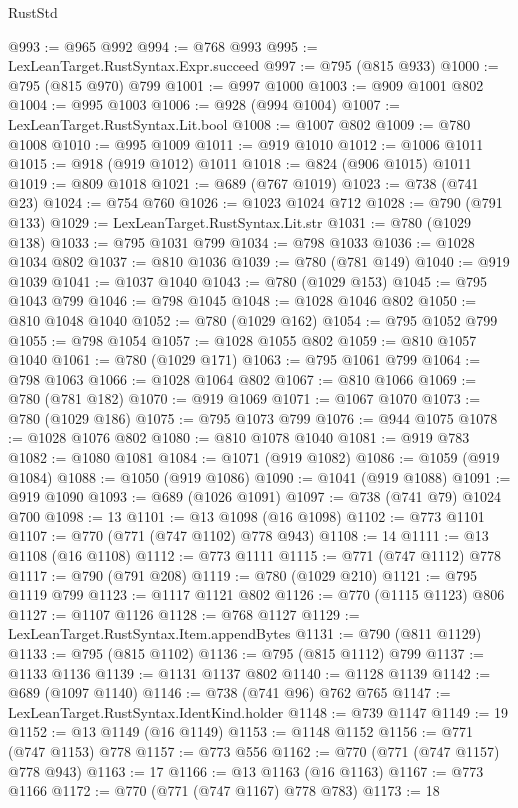 \begin{lexlean}{RustStd}
\begin{coremodule}
@993 := @965 @992
@994 := @768 @993
@995 := LexLeanTarget.RustSyntax.Expr.succeed
@997 := @795 (@815 @933)
@1000 := @795 (@815 @970) @799
@1001 := @997 @1000
@1003 := @909 @1001 @802
@1004 := @995 @1003
@1006 := @928 (@994 @1004)
@1007 := LexLeanTarget.RustSyntax.Lit.bool
@1008 := @1007 @802
@1009 := @780 @1008
@1010 := @995 @1009
@1011 := @919 @1010
@1012 := @1006 @1011
@1015 := @918 (@919 @1012) @1011
@1018 := @824 (@906 @1015) @1011
@1019 := @809 @1018
@1021 := @689 (@767 @1019)
@1023 := @738 (@741 @23)
@1024 := @754 @760
@1026 := @1023 @1024 @712
@1028 := @790 (@791 @133)
@1029 := LexLeanTarget.RustSyntax.Lit.str
@1031 := @780 (@1029 @138)
@1033 := @795 @1031 @799
@1034 := @798 @1033
@1036 := @1028 @1034 @802
@1037 := @810 @1036
@1039 := @780 (@781 @149)
@1040 := @919 @1039
@1041 := @1037 @1040
@1043 := @780 (@1029 @153)
@1045 := @795 @1043 @799
@1046 := @798 @1045
@1048 := @1028 @1046 @802
@1050 := @810 @1048 @1040
@1052 := @780 (@1029 @162)
@1054 := @795 @1052 @799
@1055 := @798 @1054
@1057 := @1028 @1055 @802
@1059 := @810 @1057 @1040
@1061 := @780 (@1029 @171)
@1063 := @795 @1061 @799
@1064 := @798 @1063
@1066 := @1028 @1064 @802
@1067 := @810 @1066
@1069 := @780 (@781 @182)
@1070 := @919 @1069
@1071 := @1067 @1070
@1073 := @780 (@1029 @186)
@1075 := @795 @1073 @799
@1076 := @944 @1075
@1078 := @1028 @1076 @802
@1080 := @810 @1078 @1040
@1081 := @919 @783
@1082 := @1080 @1081
@1084 := @1071 (@919 @1082)
@1086 := @1059 (@919 @1084)
@1088 := @1050 (@919 @1086)
@1090 := @1041 (@919 @1088)
@1091 := @919 @1090
@1093 := @689 (@1026 @1091)
@1097 := @738 (@741 @79) @1024 @700
@1098 := 13
@1101 := @13 @1098 (@16 @1098)
@1102 := @773 @1101
@1107 := @770 (@771 (@747 @1102) @778 @943)
@1108 := 14
@1111 := @13 @1108 (@16 @1108)
@1112 := @773 @1111
@1115 := @771 (@747 @1112) @778
@1117 := @790 (@791 @208)
@1119 := @780 (@1029 @210)
@1121 := @795 @1119 @799
@1123 := @1117 @1121 @802
@1126 := @770 (@1115 @1123) @806
@1127 := @1107 @1126
@1128 := @768 @1127
@1129 := LexLeanTarget.RustSyntax.Item.appendBytes
@1131 := @790 (@811 @1129)
@1133 := @795 (@815 @1102)
@1136 := @795 (@815 @1112) @799
@1137 := @1133 @1136
@1139 := @1131 @1137 @802
@1140 := @1128 @1139
@1142 := @689 (@1097 @1140)
@1146 := @738 (@741 @96) @762 @765
@1147 := LexLeanTarget.RustSyntax.IdentKind.holder
@1148 := @739 @1147
@1149 := 19
@1152 := @13 @1149 (@16 @1149)
@1153 := @1148 @1152
@1156 := @771 (@747 @1153) @778
@1157 := @773 @556
@1162 := @770 (@771 (@747 @1157) @778 @943)
@1163 := 17
@1166 := @13 @1163 (@16 @1163)
@1167 := @773 @1166
@1172 := @770 (@771 (@747 @1167) @778 @783)
@1173 := 18

\end{coremodule}
\end{lexlean}
